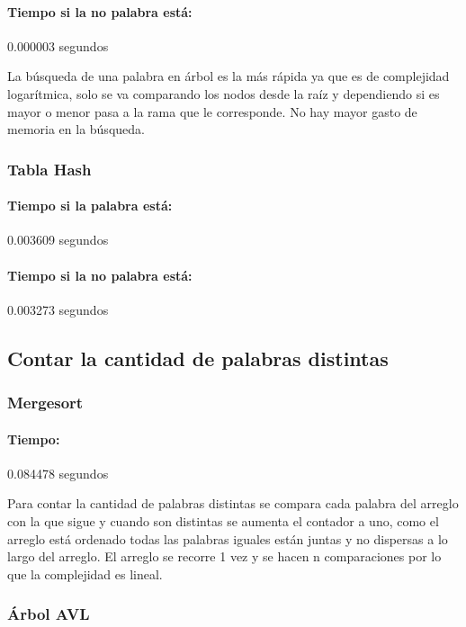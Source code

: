 \documentclass[12pt,letterpaper]{scrartcl}
\begin{document}
\paragraph{Tiempo si la no palabra está:} 0.000003 segundos

La búsqueda de una palabra en árbol es la más rápida ya que es de complejidad logarítmica, solo se va comparando los nodos desde la raíz y dependiendo si es mayor o menor pasa a la rama que le corresponde. No hay mayor gasto de memoria en la búsqueda.

\subsubsection{Tabla Hash}

\paragraph{Tiempo si la palabra está:} 0.003609 segundos

\paragraph{Tiempo si la no palabra está:}  0.003273 segundos


\subsection{Contar la cantidad de palabras distintas}

\subsubsection{Mergesort}

\paragraph{Tiempo:} 0.084478 segundos

Para contar la cantidad de palabras distintas se compara cada palabra del arreglo con la que sigue y cuando son distintas se aumenta el contador a uno, como el arreglo está ordenado todas las palabras iguales están juntas y no dispersas a lo largo del arreglo. El arreglo se recorre 1 vez y se hacen n comparaciones por lo que la complejidad es lineal.


\subsubsection{Árbol AVL}
\end{document}
